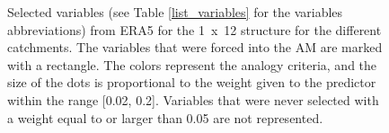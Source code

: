 \documentclass[draft]{agujournal2019}
\begin{document}
\begin{figure}[H]
	\vspace{-1cm}
	\noindent{}
	\vspace{-0.8cm}
	\caption{Selected variables (see Table \ref{list_variables} for the variables abbreviations) from ERA5 for the 1~x~12 structure for the different catchments. The variables that were forced into the AM are marked with a rectangle. The colors represent the analogy criteria, and the size of the dots is proportional to the weight given to the predictor within the range [0.02, 0.2]. Variables that were never selected with a weight equal to or larger than 0.05 are not represented.}
	\label{fig_multiple_variables_era5}
\end{figure}
\end{document}
